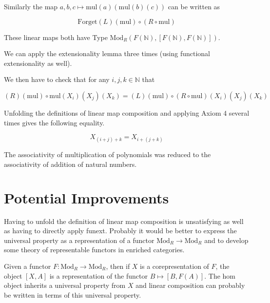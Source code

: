 \documentclass[12pt]{article} %
\theoremstyle{definition}
\theoremstyle{definition}
\theoremstyle{definition}
\theoremstyle{definition}
\begin{document}
Similarly the map $a, b, c \mapsto \text{mul} (a)(\text{mul} (b)(c))$ can be written as

\begin{equation}
  \text{Forget}(L) (\text{mul}) \circ (R \circ \text{mul})
\end{equation}

These linear maps both have Type $\text{Mod}_R(F(\mathbb{N}), [F(\mathbb{N}), F(\mathbb{N})])$.

We can apply the extensionality lemma three times (using functional extensionality as well).

We then have to check that for any $i, j, k \in \mathbb{N}$ that

\begin{equation}
  (R)(\text{mul}) \circ \text{mul}(X_i)(X_j)(X_k) = (L) (\text{mul}) \circ (R \circ \text{mul})(X_i)(X_j)(X_k)
\end{equation}

Unfolding the definitions of linear map composition and applying Axiom 4 several times gives
the following equality.

\begin{equation}
  X_{(i + j) + k} = X_{i + (j + k)}
\end{equation}

The associativity of multiplication of polynomials was reduced to the associativity of addition
of natural numbers.

\section{Potential Improvements}

Having to unfold the definition of linear map composition is unsatisfying as well as having to 
directly apply funext. Probably it would be better to express the universal property as 
a representation of a functor $\text{Mod}_R \to \text{Mod}_R$ and to develop some
theory of representable functors in enriched categories.

Given a functor $F : \text{Mod}_R \to \text{Mod}_R$, then if $X$ is a corepresentation of $F$,
the object $[X, A]$ is a representation of the functor $B \mapsto [B, F(A)]$. The hom object 
inherits a universal property from $X$ and linear composition can probably be written in terms of this 
universal property.

\end{document}
